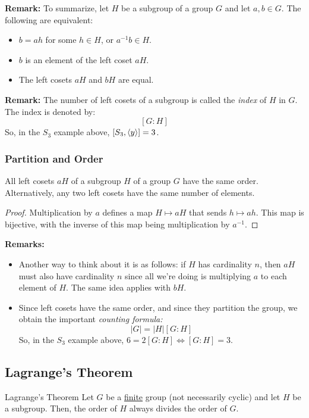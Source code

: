 \documentclass[letterpaper]{article}
\begin{document}
\textbf{Remark:} To summarize, let $H$ be a subgroup of a group $G$ and let $a, b \in G$. The following are equivalent:
\begin{itemize}
    \item $b = ah$ for some $h \in H$, or $a^{-1}b \in H$. 
    \item $b$ is an element of the left coset $aH$. 
    \item The left cosets $aH$ and $bH$ are equal. 
\end{itemize}
\textbf{Remark:} The number of left cosets of a subgroup is called the \emph{index} of $H$ in $G$. The index is denoted by: 
\[[G: H]\]
So, in the $S_3$ example above, $[S_3, \langle y \rangle] = 3$. 

\subsubsection{Partition and Order}
\begin{lemma}{}{}
    All left cosets $aH$ of a subgroup $H$ of a group $G$ have the same order. Alternatively, any two left cosets have the same number of elements. 
\end{lemma}
\begin{mdframed}
    \begin{proof}
        Multiplication by $a$ defines a map $H \mapsto aH$ that sends $h \mapsto ah$. This map is bijective, with the inverse of this map being multiplication by $a^{-1}$. 
    \end{proof}
\end{mdframed}
\textbf{Remarks:}
\begin{itemize}
    \item Another way to think about it is as follows: if $H$ has cardinality $n$, then $aH$ must also have cardinality $n$ since all we're doing is multiplying $a$ to each element of $H$. The same idea applies with $bH$. 
    \item Since left cosets have the same order, and since they partition the group, we obtain the important \emph{counting formula:}
    \[|G| = |H| [G: H]\]
    So, in the $S_3$ example above, $6 = 2 [G: H] \iff [G: H] = 3$.    
\end{itemize} 
\subsection{Lagrange's Theorem}
\begin{theorem}{Lagrange's Theorem}{}
    Let $G$ be a \underline{finite} group (not necessarily cyclic) and let $H$ be a subgroup. Then, the order of $H$ always divides the order of $G$.  
\end{theorem}
\end{document}
